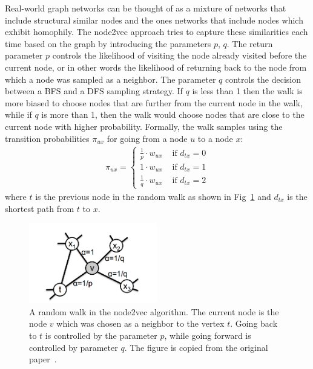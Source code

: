 Real-world graph networks can be thought of as a mixture of networks that
include structural similar nodes and the ones networks that include nodes which
exhibit homophily. The node2vec approach tries to capture these similarities each
time based on the graph by introducing the parameters $p$, $q$. The return parameter $p$ controls the
likelihood of visiting the node already visited before the current node, or in
other words the likelihood of returning back to the node from which a node was
sampled as a neighbor. The parameter $q$ controls the decision between a BFS and
a DFS sampling strategy. If $q$ is less than 1 then the walk is more biased
to choose nodes that are further from the current node in the walk, while if $q$
is more than 1, then the walk would choose nodes that are close to the current
node with higher probability. Formally, the walk samples using the transition
probabilities $\pi_{ux}$ for going from a node $u$ to a node $x$:
\begin{align}
\pi_{ux} = \begin{cases} \frac{1}{p}\cdot w_{ux} & \text{ if } d_{tx} = 0 \\
1\cdot w_{ux} & \text{ if } d_{tx} = 1 \\
\frac{1}{q}\cdot w_{ux} & \text{ if } d_{tx} = 2
\end{cases}
\end{align}
where $t$ is the previous node in the random walk as shown in
Fig~\ref{node2vec_png} and $d_{tx}$ is the shortest path from $t$ to $x$.
\begin{figure}
\begin{center}
\includegraphics[width=0.5\textwidth]{figures/node2vec.png}
\end{center}
\caption{A random walk in the node2vec algorithm. The current node is the node
$v$ which was chosen as a neighbor to the vertex $t$.
Going back to $t$ is controlled by the parameter $p$, while going forward is
controlled by parameter $q$. The figure is copied from the original
paper~\cite{grover2016node2vec}.}
\label{node2vec_png}
\end{figure}

